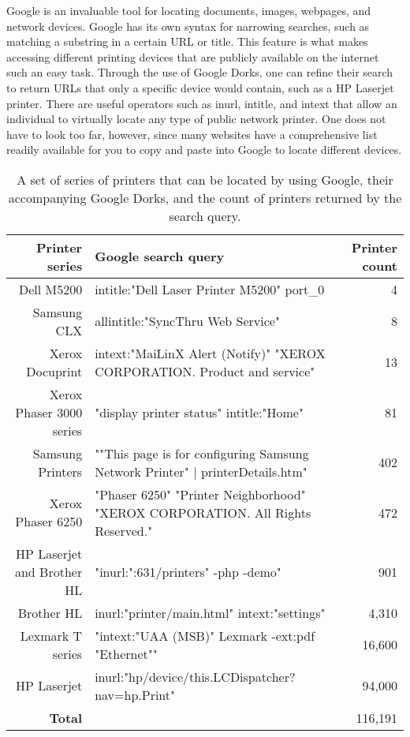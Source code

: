 Google is an invaluable tool for locating documents, images, webpages, and network devices.
Google has its own syntax for narrowing searches, such as matching a substring in a certain URL or title.
This feature is what makes accessing different printing devices that are publicly available on the internet such an easy task.
Through the use of Google Dorks, one can refine their search to return URLs that only a specific device would contain, such as a HP Laserjet printer.
There are useful operators such as inurl, intitle, and intext that allow an individual to virtually locate any type of public network printer.
One does not have to look too far, however, since many websites have a comprehensive list readily available for you to copy and paste into Google to locate different devices.

\begin{table*}
    \centering
\label{printer_dorks}
\begin{tabular}{r| p{9cm} | r}
    \hline
    \hline
    {\bf Printer series} & {\bf Google search query} & {\bf Printer count} \\
    \hline    
    Dell M5200 & intitle:"Dell Laser Printer M5200" port\_0 & 4 \\
    \hline
    Samsung CLX & allintitle:"SyncThru Web Service" & 8 \\
    \hline
    Xerox Docuprint & intext:"MaiLinX Alert (Notify)" "XEROX CORPORATION. Product and service" & 13 \\
    \hline
    Xerox Phaser 3000 series & "display printer status" intitle:"Home" & 81 \\
    \hline
    Samsung Printers & ""This page is for configuring Samsung Network Printer" | printerDetails.htm" & 402 \\
    \hline
    Xerox Phaser 6250 & "Phaser 6250" "Printer Neighborhood" "XEROX CORPORATION. All Rights Reserved." & 472 \\
    \hline
    HP Laserjet and Brother HL & "inurl:":631/printers" -php -demo" & 901 \\
    \hline
    Brother HL & inurl:"printer/main.html" intext:"settings" & 4,310 \\
    \hline
    Lexmark T series & "intext:"UAA (MSB)"  Lexmark -ext:pdf "Ethernet"" & 16,600 \\
    \hline
    HP Laserjet & inurl:"hp/device/this.LCDispatcher?nav=hp.Print" & 94,000 \\
    \hline
    \hline
    {\bf Total} & & 116,191 \\
    \hline
\end{tabular}
\caption{A set of series of printers that can be located by using Google, their accompanying Google Dorks, and the count of printers returned by the search query.}
\end{table*}

